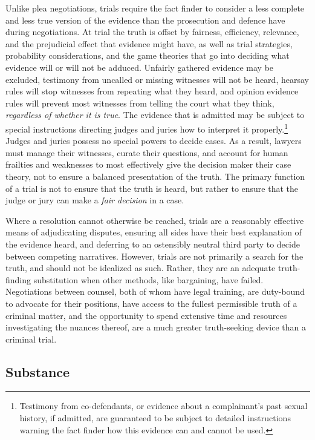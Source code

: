 Unlike plea negotiations, trials require the fact finder to consider a less complete and less true version of the evidence than the prosecution and defence have during negotiations. At trial the truth is offset by fairness, efficiency, relevance, and the prejudicial effect that evidence might have, as well as trial strategies, probability considerations, and the game theories that go into deciding what evidence will or will not be adduced. Unfairly gathered evidence may be excluded, testimony from uncalled or missing witnesses will not be heard, hearsay rules will stop witnesses from repeating what they heard, and opinion evidence rules will prevent most witnesses from telling the court what they think, \textit{regardless of whether it is true}. The evidence that is admitted may be subject to special instructions directing judges and juries how to interpret it properly.\footnote{Testimony from co-defendants, or evidence about a complainant's past sexual history, if admitted, are guaranteed to be subject to detailed instructions warning the fact finder how this evidence can and cannot be used.} Judges and juries possess no special powers to decide cases. As a result, lawyers must manage their witnesses, curate their questions, and account for human frailties and weaknesses to most effectively give the decision maker their case theory, not to ensure a balanced presentation of the truth. The primary function of a trial is not to ensure that the truth is heard, but rather to ensure that the judge or jury can make a \textit{fair decision} in a case. 

Where a resolution cannot otherwise be reached, trials are a reasonably effective means of adjudicating disputes, ensuring all sides have their best explanation of the evidence heard, and deferring to an ostensibly neutral third party to decide between competing narratives. However, trials are not primarily a search for the truth, and should not be idealized as such. Rather, they are an adequate truth-finding substitution when other methods, like bargaining, have failed. Negotiations between counsel, both of whom have legal training, are duty-bound to advocate for their positions, have access to the fullest permissible truth of a criminal matter, and the opportunity to spend extensive time and resources investigating the nuances thereof, are a much greater truth-seeking device than a criminal trial.

\subsection{Substance}

